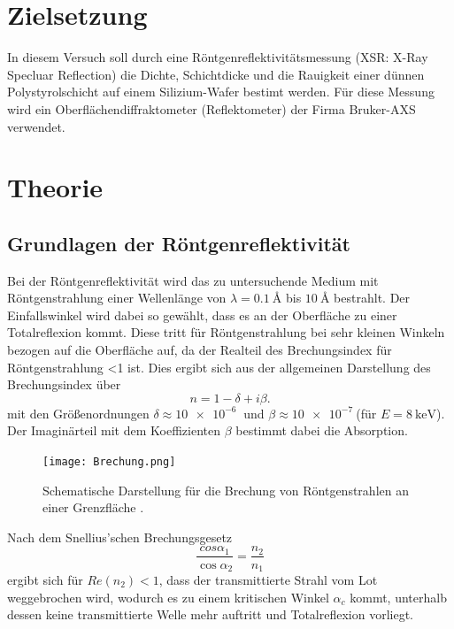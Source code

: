 \section{Zielsetzung}
In diesem Versuch soll durch eine Röntgenreflektivitätsmessung (XSR: X-Ray Specluar Reflection) die Dichte, Schichtdicke und die
Rauigkeit einer dünnen Polystyrolschicht auf einem Silizium-Wafer bestimt werden.
Für diese Messung wird ein Oberflächendiffraktometer (Reflektometer) der Firma Bruker-AXS
verwendet.

\section{Theorie}
\subsection{Grundlagen der Röntgenreflektivität}
Bei der Röntgenreflektivität wird das zu untersuchende Medium mit Röntgenstrahlung einer Wellenlänge von
$\lambda=\SI{0,1}{\angstrom}$ bis $\SI{10}{\angstrom}$ bestrahlt. Der Einfallswinkel wird dabei so
gewählt, dass es an der Oberfläche zu einer Totalreflexion kommt.
Diese tritt für Röntgenstrahlung bei sehr kleinen Winkeln bezogen auf die Oberfläche auf, da der Realteil
des Brechungsindex für Röntgenstrahlung <1 ist. Dies ergibt sich aus der allgemeinen Darstellung des Brechungsindex
über
\begin{equation}
  n=1-\delta+i\beta.
\end{equation}
mit den Größenordnungen $\delta\approx \SI{10e-6}{}$ und $\beta\approx\SI{10e-7}{}$(für $E=\SI{8}{\keV}$).
Der Imaginärteil mit dem Koeffizienten $\beta$ bestimmt dabei die Absorption.

\begin{figure}
  \centering
  \texttt{[image: Brechung.png]}
  \caption{Schematische Darstellung für die Brechung von Röntgenstrahlen an einer Grenzfläche \cite{XSR}.}
  \label{}
\end{figure}

Nach dem Snellius'schen Brechungsgesetz
\begin{equation}
  \frac{cos\alpha_1}{\cos\alpha_2}=\frac{n_2}{n_1}
\end{equation}
ergibt sich für $Re(n_2)<1$, dass der transmittierte Strahl vom Lot weggebrochen wird, wodurch es zu
einem kritischen Winkel $\alpha_c$ kommt, unterhalb dessen keine transmittierte Welle mehr auftritt und
Totalreflexion vorliegt.

